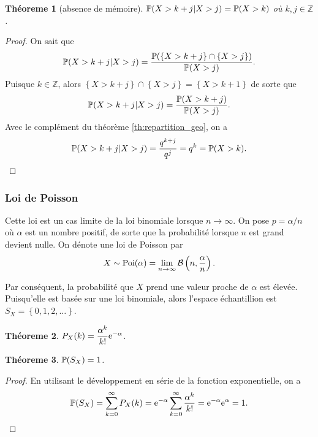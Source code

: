\documentclass[11pt]{article}
\renewcommand\P{%
	\ensuremath{%
		\mathbb{P}%
	}%
}%
\newcommand\e{%
	\ensuremath{%
		\mathrm{e}%
	}%
}%
\newcommand\bin{%
	\ensuremath{%
		\mathcal{B}%
	}%
}%
\newcommand\poi{%
	\ensuremath{%
		\mathrm{Poi}%
	}%
}%
\newtheorem{theoreme}{Théoreme}[section]
\begin{document}
\begin{theoreme}[absence de mémoire]
	$\P(X>k+j|X>j)=\P(X>k)$ où $k,j\in\mathbb{Z}$.
\end{theoreme}

\begin{proof}
	On sait que
	\begin{equation*}
		\P(X>k+j|X>j)=\frac{\P(
			\left\{X>k+j\right\}\cap
	   		\left\{X>j\right\})}{\P(X>j)}.
	\end{equation*}
	Puisque $k\in\mathbb{Z}$, alors $\left\{X>k+j\right\}\cap\left\{X>j\right\}
	=\left\{X>k+1\right\}$ de sorte que
	\begin{equation*}
		\P(X>k+j|X>j)=\frac{\P(X>k+j)}{\P(X>j)}.
	\end{equation*}
	Avec le complément du théorème \ref{th:repartition_geo}, on a
	\begin{equation*}
		\P(X>k+j|X>j)=\frac{q^{k+j}}{q^{j}}=q^{k}=\P(X>k).\qedhere
	\end{equation*}
\end{proof}

\subsubsection{Loi de Poisson}
Cette loi est un cas limite de la loi binomiale lorsque $n\rightarrow\infty$.
On pose $p=\alpha/n$ où $\alpha$ est un nombre positif, de sorte que la 
probabilité lorsque $n$ est grand devient nulle. On dénote une loi de Poisson
par
\begin{equation*}
	X\sim\poi(\alpha)
	=\lim_{n\rightarrow\infty}\bin\left(n,\frac{\alpha}{n}\right).
\end{equation*}

Par conséquent, la probabilité que $X$ prend une valeur proche de $\alpha$ est
élevée. Puisqu'elle est basée sur une loi binomiale, alors l'espace
échantillion est $S_X=\left\{0,1,2,\dots\right\}$.

\begin{theoreme}
	$P_X(k)=\dfrac{\alpha^k}{k!}\e^{-\alpha}$.
\end{theoreme}

\begin{theoreme}
	$\P(S_X)=1$.
\end{theoreme}

\begin{proof}
	En utilisant le développement en série de la fonction exponentielle, on a
	\begin{equation*}
		\P(S_X)
		=\sum_{k=0}^\infty P_X(k)
		=\e^{-\alpha}\sum_{k=0}^\infty\frac{\alpha^k}{k!}
		=\e^{-\alpha}\e^\alpha
		=1.\qedhere
	\end{equation*}
\end{proof}
\end{document}
